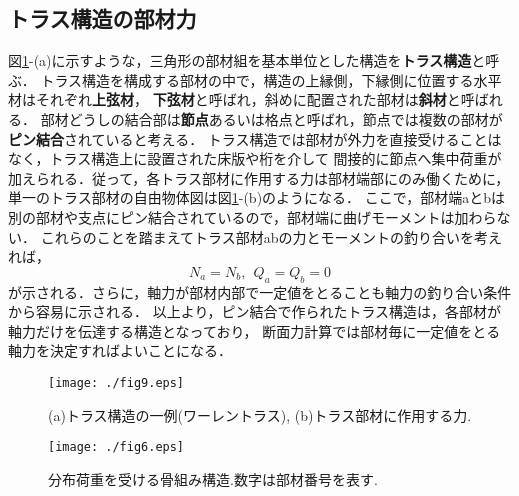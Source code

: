 ﻿\documentclass[10pt,a4j]{jbook}
\begin{document}
\subsection{トラス構造の部材力}
図\ref{fig:fig12_9}-(a)に示すような，三角形の部材組を基本単位とした構造を{\bf トラス構造}と呼ぶ．
トラス構造を構成する部材の中で，構造の上縁側，下縁側に位置する水平材はそれぞれ{\bf 上弦材}，
{\bf 下弦材}と呼ばれ，斜めに配置された部材は{\bf 斜材}と呼ばれる．
部材どうしの結合部は{\bf 節点}あるいは格点と呼ばれ，節点では複数の部材が{\bf ピン結合}されていると考える．
トラス構造では部材が外力を直接受けることはなく，トラス構造上に設置された床版や桁を介して
間接的に節点へ集中荷重が加えられる．従って，各トラス部材に作用する力は部材端部にのみ働くために，
単一のトラス部材の自由物体図は図\ref{fig:fig12_9}-(b)のようになる．
ここで，部材端aとbは別の部材や支点にピン結合されているので，部材端に曲げモーメントは加わらない．
これらのことを踏まえてトラス部材abの力とモーメントの釣り合いを考えれば，
\begin{equation}
	N_a=N_b, \ \ Q_a=Q_b=0
\end{equation}
が示される．さらに，軸力が部材内部で一定値をとることも軸力の釣り合い条件から容易に示される．
以上より，ピン結合で作られたトラス構造は，各部材が軸力だけを伝達する構造となっており，
断面力計算では部材毎に一定値をとる軸力を決定すればよいことになる．
\begin{figure}[h]
	\begin{center}
	\texttt{[image: ./fig9.eps]} 
	\end{center}
	\caption{
		(a)トラス構造の一例(ワーレントラス), (b)トラス部材に作用する力. 
	} 
	\label{fig:fig12_9}
\end{figure}
\begin{figure}[h]
	\begin{center}
	\texttt{[image: ./fig6.eps]} 
	\end{center}
	\caption{
		分布荷重を受ける骨組み構造.数字は部材番号を表す.
	} 
	\label{fig:fig12_6}
\end{figure}
\end{document}
